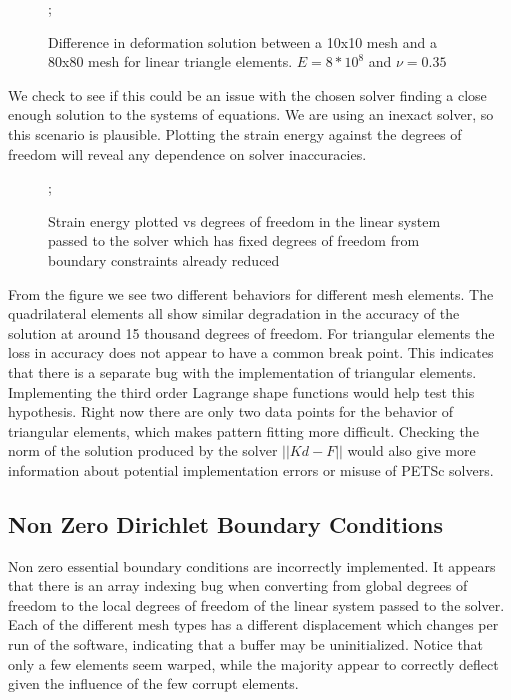 \documentclass{article}
\begin{document}
\begin{figure}
    ;
    \caption{Difference in deformation solution between a 10x10 mesh and a 80x80 mesh for linear triangle elements. $E = 8*10^8$ and $\nu = 0.35$}
\centering
\end{figure}
\FloatBarrier
We check to see if this could be an issue with the chosen solver finding a close enough solution to the systems of equations. We are using an inexact solver, so this scenario is plausible. Plotting the strain energy against the degrees of freedom will reveal any dependence on solver inaccuracies.
\FloatBarrier
\begin{figure}
    ;
    \caption{Strain energy plotted vs degrees of freedom in the linear system passed to the solver which has fixed degrees of freedom from boundary constraints already reduced}
\centering
\end{figure}
\FloatBarrier
From the figure we see two different behaviors for different mesh elements. The quadrilateral elements all show similar degradation in the accuracy of the solution at around 15 thousand degrees of freedom. For triangular elements the loss in accuracy does not appear to have a common break point. This indicates that there is a separate bug with the implementation of triangular elements. Implementing the third order Lagrange shape functions would help test this hypothesis. Right now there are only two data points for the behavior of triangular elements, which makes pattern fitting more difficult. Checking the norm of the solution produced by the solver $||Kd - F||$ would also give more information about potential implementation errors or misuse of PETSc solvers.


\FloatBarrier
\subsection{Non Zero Dirichlet Boundary Conditions}
Non zero essential boundary conditions are incorrectly implemented. It appears that there
is an array indexing bug when converting from global degrees of freedom to the local degrees of freedom of the linear system passed to the solver. Each of the different mesh types has a different displacement which changes per run of the software, indicating that a buffer may be uninitialized. Notice that only a few elements seem warped, while the majority appear to correctly deflect given the influence of the few corrupt elements.
\FloatBarrier
\end{document}
